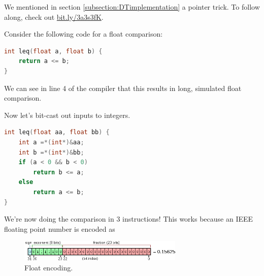 We mentioned in section \ref{subsection:DTimplementation} a pointer trick. To follow along, check out \href{https://dpu.dev/#g:!((g:!((g:!((g:!((h:codeEditor,i:(j:1,lang:___c,source:'int+leq(float+a,+float+b)+%7B%0A++++return+a+%3C%3D+b%3B%0A%7D%0A'),l:'5',n:'0',o:'C+source+%231',t:'0')),k:37.5,l:'4',m:50,n:'0',o:'',s:0,t:'0'),(g:!((h:codeEditor,i:(j:2,lang:___c,source:'int+leq(float+aa,+float+bb)+%7B%0A++++int+a+%3D*(int*)%26aa%3B%0A++++int+b+%3D*(int*)%26bb%3B%0A++++if+(a+%3C+0+%26%26+b+%3C+0)%0A++++++++return+b+%3C%3D+a%3B%0A++++else%0A++++++++return+a+%3C%3D+b%3B%0A%7D%0A'),l:'5',n:'0',o:'C+source+%232',t:'0')),header:(),l:'4',m:50,n:'0',o:'',s:0,t:'0')),k:47.25848563968668,l:'3',n:'0',o:'',t:'0'),(g:!((g:!((h:compiler,i:(compiler:clang-2021-3,filters:(b:'0',binary:'1',commentOnly:'0',demangle:'0',directives:'0',execute:'1',intel:'0',libraryCode:'1',trim:'1'),lang:___c,libs:!(),options:'',source:1),l:'5',n:'0',o:'clang+12+for+DPU+(rel+2021.3.0)+(Editor+%231,+Compiler+%231)+C',t:'0')),header:(),k:62.5,l:'4',m:50,n:'0',o:'',s:0,t:'0'),(g:!((h:compiler,i:(compiler:clang-2021-3,filters:(b:'0',binary:'1',commentOnly:'0',demangle:'0',directives:'0',execute:'1',intel:'0',libraryCode:'1',trim:'1'),lang:___c,libs:!(),options:'',source:2),l:'5',n:'0',o:'clang+12+for+DPU+(rel+2021.3.0)+(Editor+%232,+Compiler+%232)+C',t:'0')),header:(),l:'4',m:50,n:'0',o:'',s:0,t:'0')),k:52.74151436031331,l:'3',n:'0',o:'',t:'0')),l:'2',m:100,n:'0',o:'',t:'0')),version:4}{bit.ly/3a3s3fK}.

Consider the following code for a float comparison:
\begin{lstlisting}[language=C]
int leq(float a, float b) {
    return a <= b;
}
\end{lstlisting}

We can see in line 4 of the compiler that this results in long, simulated float comparison.

Now let's bit-cast out inputs to integers.
\begin{lstlisting}[language=C]
int leq(float aa, float bb) {
    int a =*(int*)&aa;
    int b =*(int*)&bb;
    if (a < 0 && b < 0)
        return b <= a;
    else
        return a <= b;
}
\end{lstlisting}

We're now doing the comparison in 3 instructions! This works because an IEEE floating point number is encoded as 

\begin{figure}[h]
    \includegraphics[width=0.7\textwidth]{figures/Float_example.svg.png}
    \caption[Float encoding.]{Float encoding.\footnotemark}
\end{figure}


